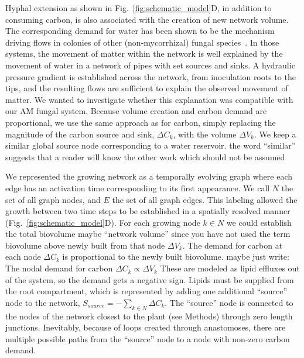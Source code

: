 Hyphal extension as shown in Fig.~\ref{fig:schematic_model}D, in addition to consuming carbon, is also associated with the creation of new network volume.
The corresponding demand for water has been shown to be the mechanism driving flows in colonies of other (non-mycorrhizal) fungal species~\cite{heaton_growth-induced_2010, heaton_advection_2012}.
In those systems, the movement of matter within the network is well explained by the movement of water in a network of pipes with set sources and sinks. A hydraulic pressure gradient is established across the network, from inoculation roots to the tips, and the resulting flows are sufficient to explain the observed movement of matter.
We wanted to investigate whether this explanation was compatible with our AM fungal system.
Because volume creation and carbon demand are proportional, we use the same approach as for carbon, simply replacing the magnitude of the carbon source and sink, $\Delta C_k$, with the volume $\Delta V_k$.
We keep a similar global source node corresponding to a water reservoir. {\color{blue} the word ``similar'' suggests that a reader will know the other work which should not be assumed}

We represented the growing network as a temporally evolving graph where each edge has an activation time corresponding to its first appearance.
We call $N$ the set of all graph nodes, and $E$ the set of all graph edges.
This labeling allowed the growth between two time steps to be established in a spatially resolved manner (Fig.~\ref{fig:schematic_model}D).
For each growing node $k\in N$ we could establish the total biovolume {\color{blue} maybe ``network volume'' since you have not used the term biovolume above} newly built from that node $\Delta V_k$.
The demand for carbon at each node $\Delta C_k$ is proportional to the newly built biovolume. {\color{blue} maybe just write: The nodal demand for carbon  $\Delta C_k\propto\Delta V_k $
} These are modeled as lipid effluxes out of the system, so the demand gets a negative sign. Lipids must be supplied from the root compartment, which is represented by adding one additional ``source'' node to the network, $S_{source} = - \sum_{k \in N} \Delta C_k$. The ``source'' node is connected to the nodes of the network closest to the plant (see Methods) through zero length junctions. Inevitably, because of loops created through anastomoses, there are multiple possible paths from the ``source'' node to a node with non-zero carbon demand. 

